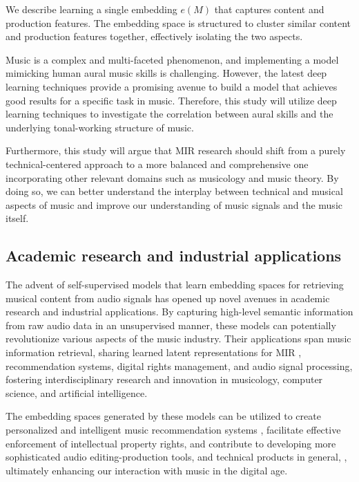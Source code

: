 We describe learning a single embedding $e(M)$ that captures content and production features. The embedding space is structured to cluster similar content and production features together, effectively isolating the two aspects.

Music is a complex and multi-faceted phenomenon, and implementing a model mimicking human aural music skills is challenging. However, the latest deep learning techniques provide a promising avenue to build a model that achieves good results for a specific task in music. Therefore, this study will utilize deep learning techniques to investigate the correlation between aural skills and the underlying tonal-working structure of music.

Furthermore, this study will argue that MIR research should shift from a purely technical-centered approach to a more balanced and comprehensive one incorporating other relevant domains such as musicology and music theory. By doing so, we can better understand the interplay between technical and musical aspects of music and improve our understanding of music signals and the music itself.


\subsection{Academic research and industrial applications}

The advent of self-supervised models that learn embedding spaces for retrieving musical content from audio signals has opened up novel avenues in academic research and industrial applications. By capturing high-level semantic information from raw audio data in an unsupervised manner, these models can potentially revolutionize various aspects of the music industry. Their applications span music information retrieval, sharing learned latent representations for MIR \cite{HamelTransferSimilarity}, recommendation systems, digital rights management, and audio signal processing, fostering interdisciplinary research and innovation in musicology, computer science, and artificial intelligence. 

The embedding spaces generated by these models can be utilized to create personalized and intelligent music recommendation systems \cite{Chen2020LearningRecommendation}\cite{epidemic}, facilitate effective enforcement of intellectual property rights, and contribute to developing more sophisticated audio editing-production tools, and technical products in general, \cite{WonEmotionStories}, ultimately enhancing our interaction with music in the digital age.

